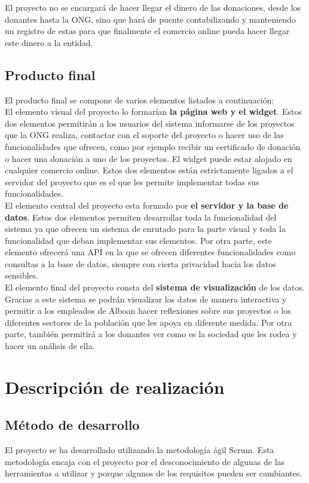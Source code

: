 El proyecto no se encargará de hacer llegar el dinero de las donaciones, desde los donantes hasta la ONG, sino que hará de puente contabilizando y manteniendo un registro de estas para que finalmente el comercio online pueda hacer llegar este dinero a la entidad.

\subsection{Producto final}
El producto final se compone de varios elementos listados a continuación:\\

El elemento visual del proyecto lo formarían \textbf{la página web y el widget}. Estos dos elementos permitirán a los usuarios del sistema informarse de los proyectos que la ONG realiza, contactar con el soporte del proyecto o hacer uso de las funcionalidades que ofrecen, como por ejemplo recibir un certificado de donación o hacer una donación a uno de los proyectos. El widget puede estar alojado en cualquier comercio online. Estos dos elementos están estrictamente ligados a el servidor del proyecto que es el que les permite implementar todas sus funcionalidades.\\

El elemento central del proyecto esta formado por \textbf{el servidor y la base de datos}. Estos dos elementos permiten desarrollar toda la funcionalidad del sistema ya que ofrecen un sistema de enrutado para la parte visual y toda la funcionalidad que deban implementar sus elementos. Por otra parte, este elemento ofrecerá una API en la que se ofrecen diferentes funcionalidades como consultas a la base de datos, siempre con cierta privacidad hacia los datos sensibles.\\

El elemento final del proyecto consta del \textbf{sistema de visualización} de los datos. Gracias a este sistema se podrán visualizar los datos de manera interactiva y permitir a los empleados de Alboan hacer reflexiones sobre sus proyectos o los diferentes sectores de la población que les apoya en diferente medida. Por otra parte, también permitirá a los donantes ver como es la sociedad que les rodea y hacer un análisis de ella.

\section{Descripción de realización}

\subsection{Método de desarrollo}
El proyecto se ha desarrollado utilizando la metodología ágil Scrum. Esta metodología encaja con el proyecto por el desconocimiento de algunas de las herramientas a utilizar y porque algunos de los requisitos pueden ser cambiantes.\\

